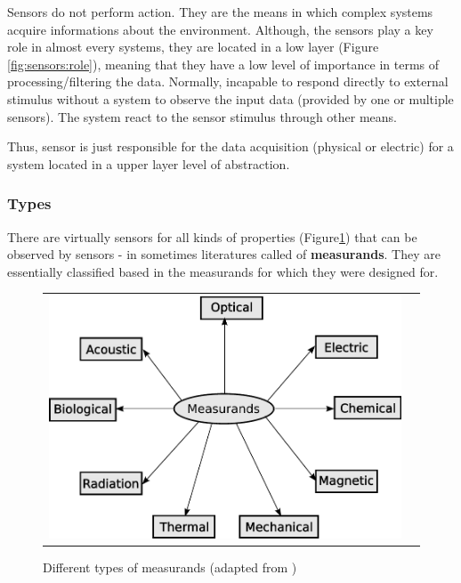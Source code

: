 Sensors do not perform action. They are the means in which complex systems acquire informations about the environment. Although, the sensors play a key role in almost every systems, they are located in a low layer (Figure \ref{fig:sensors:role}), meaning that they have a low level of importance in terms of processing/filtering the data. Normally, incapable to respond directly to external stimulus without a system to observe the input data (provided by one or multiple sensors). The system react to the sensor stimulus through other means.

Thus, sensor is just responsible for the data acquisition (physical or electric) for a system located in a upper layer level of abstraction.

\subsubsection{Types}

There are virtually sensors for all kinds of properties (Figure\ref{fig:sensors}) that can be observed by sensors - in sometimes literatures called of \textbf{measurands}. They are essentially classified based in the measurands for which they were designed for.

\begin{figure}[h]
   \centering
     \begin{tabular}{lr}
       \includegraphics[scale=0.70]{img/fig:sensors}
     \end{tabular}
   \caption{Different types of measurands (adapted from \cite{WhiteRichard})}
   \label{fig:sensors}
 \end{figure}

